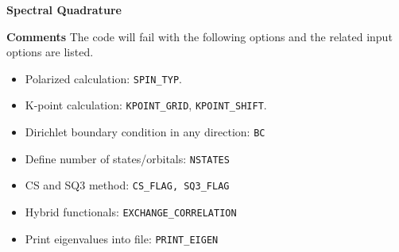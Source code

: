 
\begin{frame}[allowframebreaks,c]{} \label{SQ}

\begin{center}
\Huge \textbf{Spectral Quadrature}
\end{center}

\end{frame}

\begin{frame}[allowframebreaks]{\textbf{Comments}} \label{SQ_COMMENTS}
The code will fail with the following options and the related input options are listed.
\begin{itemize}
  \item Polarized calculation: \texttt{SPIN\_TYP}.
  \item K-point calculation: \texttt{KPOINT\_GRID}, \texttt{KPOINT\_SHIFT}.
  \item Dirichlet boundary condition in any direction: \texttt{BC}
  \item Define number of states/orbitals: \texttt{NSTATES}
  \item CS and SQ3 method: \texttt{CS\_FLAG, SQ3\_FLAG}
  \item Hybrid functionals: \texttt{EXCHANGE\_CORRELATION}
  \item Print eigenvalues into file: \texttt{PRINT\_EIGEN}
\end{itemize}


\end{frame}

